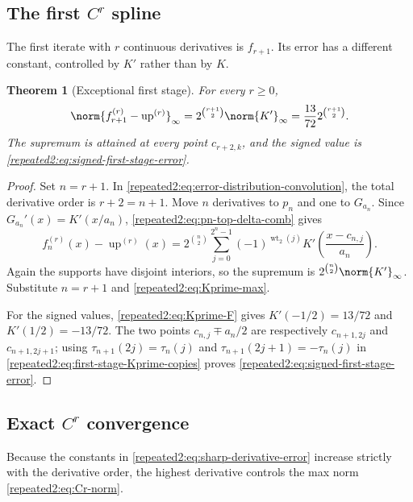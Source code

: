 \documentclass[11pt,oneside]{article}
\newtheorem{theorem}{Theorem}[section]
\theoremstyle{definition}
\theoremstyle{remark}
\newcommand{\Up}{\operatorname{up}}
\newcommand{\wt}{\operatorname{wt}_2}
\begin{document}
\subsection{The first \texorpdfstring{$C^r$}{C-r} spline}

The first iterate with $r$ continuous derivatives is $f_{r+1}$.  Its error has a different
constant, controlled by $K'$ rather than by $K$.

\begin{theorem}[Exceptional first stage]
\label{repeated2:thm:first-admissible-stage}
For every $r\ge0$,
\begin{equation}
 \norm{f_{r+1}^{(r)}-\Up^{(r)}}_\infty
 =2^{\binom{r+1}{2}}\norm{K'}_\infty
 =\frac{13}{72}2^{\binom{r+1}{2}}.
 \label{repeated2:eq:first-stage-full}
\end{equation}
The supremum is attained at every point $c_{r+2,k}$, and the signed value is
\eqref{repeated2:eq:signed-first-stage-error}.
\end{theorem}

\begin{proof}
Set $n=r+1$.  In \eqref{repeated2:eq:error-distribution-convolution}, the total derivative order is
$r+2=n+1$.  Move $n$ derivatives to $p_n$ and one to $G_{a_n}$.  Since
$G_{a_n}'(x)=K'(x/a_n)$, \eqref{repeated2:eq:pn-top-delta-comb} gives
\begin{equation}
 f_n^{(r)}(x)-\Up^{(r)}(x)
 =2^{\binom n2}\sum_{j=0}^{2^n-1}(-1)^{\wt(j)}
 K'\left(\frac{x-c_{n,j}}{a_n}\right).
 \label{repeated2:eq:first-stage-Kprime-copies}
\end{equation}
Again the supports have disjoint interiors, so the supremum is
$2^{\binom n2}\norm{K'}_\infty$.  Substitute $n=r+1$ and
\eqref{repeated2:eq:Kprime-max}.

For the signed values, \eqref{repeated2:eq:Kprime-F} gives
$K'(-1/2)=13/72$ and $K'(1/2)=-13/72$.  The two points
$c_{n,j}\mp a_n/2$ are respectively $c_{n+1,2j}$ and $c_{n+1,2j+1}$; using
$\tau_{n+1}(2j)=\tau_n(j)$ and
$\tau_{n+1}(2j+1)=-\tau_n(j)$ in
\eqref{repeated2:eq:first-stage-Kprime-copies} proves
\eqref{repeated2:eq:signed-first-stage-error}.
\end{proof}

\subsection{Exact \texorpdfstring{$C^r$}{C-r} convergence}

Because the constants in \eqref{repeated2:eq:sharp-derivative-error} increase strictly with the
derivative order, the highest derivative controls the max norm \eqref{repeated2:eq:Cr-norm}.
\end{document}
